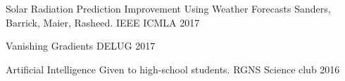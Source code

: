 
\begin{cvhonors}

\cvhonor
{Solar Radiation Prediction Improvement Using Weather Forecasts}
{Sanders, Barrick, Maier, Rasheed.}
{IEEE ICMLA}
{2017}

\end{cvhonors}


\begin{cvhonors}

\cvhonor
{Vanishing Gradients}
{}
{DELUG}
{2017}

\cvhonor
{Artificial Intelligence}
{Given to high-school students. }
{RGNS Science club}
{2016}

\end{cvhonors}
